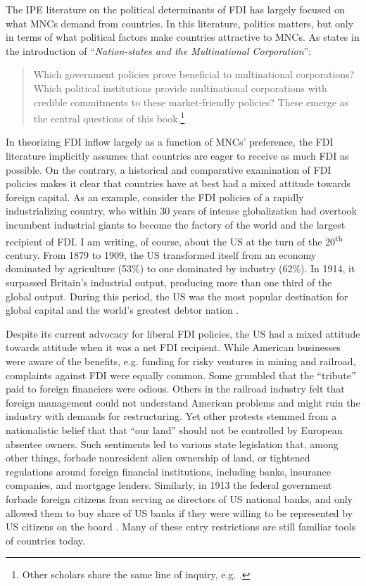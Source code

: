 The IPE literature on the political determinants of FDI has largely focused on
what MNCs demand from countries. In this literature, politics matters, but only
in terms of what political factors make countries attractive to MNCs. As
\citet{Jensen2008b} states in the introduction of ``\textit{Nation-states and the
  Multinational Corporation}'':

\begin{quote}
  Which government policies prove beneficial to multinational corporations?
  Which political institutions provide multinational corporations with credible
  commitments to these market-friendly policies? These emerge as the central
  questions of this book.\footnote{Other scholars share the same line of
    inquiry, e.g.
  \citet{Ahlquist2006, Busse2007, Buthe2008, Li2003}.}
\end{quote}

In theorizing FDI inflow largely as a function of MNCs' preference, the FDI
literature implicitly assumes that countries are eager to receive as much FDI as
possible. On the contrary, a historical and comparative examination of FDI
policies makes it clear that countries have at best had a mixed attitude towards
foreign capital. As an example, consider the FDI policies of a rapidly
industrializing country, who within 30 years of intense globalization had
overtook incumbent industrial giants to become the factory of the world and the
largest recipient of FDI. I am writing, of course, about the US at the turn of
the 20\textsuperscript{th} century. From 1879 to 1909, the US transformed itself
from an economy dominated by agriculture (53\%) to one dominated by industry
(62\%). In 1914, it surpassed Britain's industrial output, producing more than
one third of the global output. During this period, the US was the most
popular destination for global capital and the world's greatest debtor nation
\citep[part II]{Wilkins1989}.

Despite its current advocacy for liberal FDI policies, the US had a
mixed attitude towards attitude when it was a net FDI recipient. While American
businesses were aware of the benefits, e.g. funding for risky ventures in mining
and railroad, complaints against FDI were equally common. Some grumbled that the
``tribute'' paid to foreign financiers were odious. Others in the railroad
industry felt that foreign management could not understand American problems and
might ruin the industry with demands for restructuring. Yet other protests
stemmed from a nationalistic belief that that ``our land'' should not be
controlled by European absentee owners. Such sentiments led to various state
legislation that, among other things, forbade nonresident alien ownership of
land, or tightened regulations around foreign financial institutions, including
banks, insurance companies, and mortgage lenders. Similarly, in 1913 the federal
government forbade foreign citizens from serving as directors of US national
banks, and only allowed them to buy share of US banks if they were willing to be
represented by US citizens on the board \citep[part II]{Wilkins1989}. Many of
these entry restrictions are still familiar tools of countries today.

